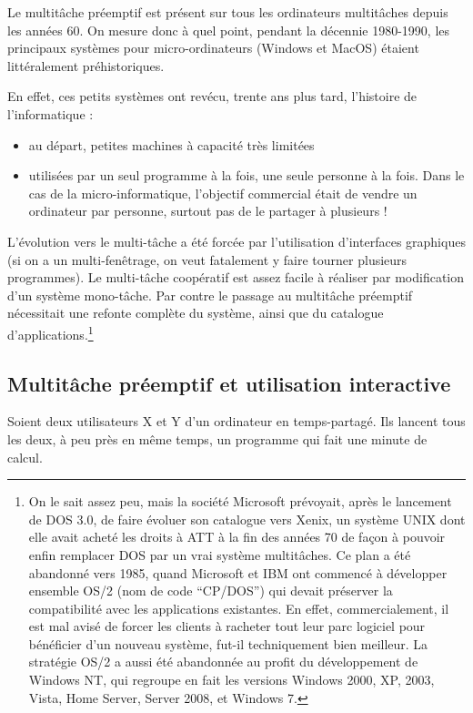 \begin{multicols}{2}
Le multitâche préemptif est présent sur tous les
ordinateurs multitâches depuis les années 60.  On mesure donc à quel point, 
pendant la décennie 1980-1990, les principaux systèmes pour micro-ordinateurs (Windows et MacOS)
étaient littéralement préhistoriques.


En effet, ces petits systèmes ont revécu, trente ans plus tard, l'histoire de l'informatique :
\begin{itemize}
\item au départ, petites machines à capacité très limitées
\item utilisées par un seul programme à la fois, une seule personne à
  la fois. Dans le cas de la micro-informatique, l'objectif commercial était de vendre un ordinateur par
  personne, surtout pas de le partager à plusieurs !
\end{itemize}
L'évolution vers le multi-tâche a été forcée par l'utilisation
d'interfaces graphiques (si on a un multi-fenêtrage, on veut fatalement  y faire
tourner plusieurs programmes). Le multi-tâche coopératif est assez
facile à réaliser par modification d'un système mono-tâche. Par contre
le passage au multitâche préemptif nécessitait une refonte complète du
système, ainsi que du catalogue d'applications.\footnote{On le sait
  assez peu, mais la société Microsoft prévoyait, après le lancement
  de DOS 3.0, de faire évoluer son catalogue vers Xenix, un système
  UNIX dont elle avait acheté les droits à ATT à la fin des années 70
  de façon à pouvoir enfin remplacer DOS par un vrai système
  multitâches. Ce plan a été abandonné vers 1985, quand Microsoft et
  IBM ont commencé à développer ensemble OS/2 (nom de code ``CP/DOS'')
  qui devait préserver la compatibilité avec les applications
  existantes. En effet, commercialement, il est mal avisé de forcer
  les clients à racheter tout leur parc logiciel pour bénéficier d'un
  nouveau système, fut-il techniquement bien meilleur. La stratégie OS/2 a
  aussi été abandonnée au profit du développement de 
  Windows NT, qui regroupe en fait
  les versions Windows 2000, XP, 2003, Vista, Home Server, Server
  2008, et Windows 7.  }



\subsection{Multitâche préemptif et utilisation interactive}

Soient deux utilisateurs X et Y d'un ordinateur en temps-partagé. Ils
lancent tous les deux, à peu près en même temps, un programme qui fait une minute de calcul.


\end{multicols}

